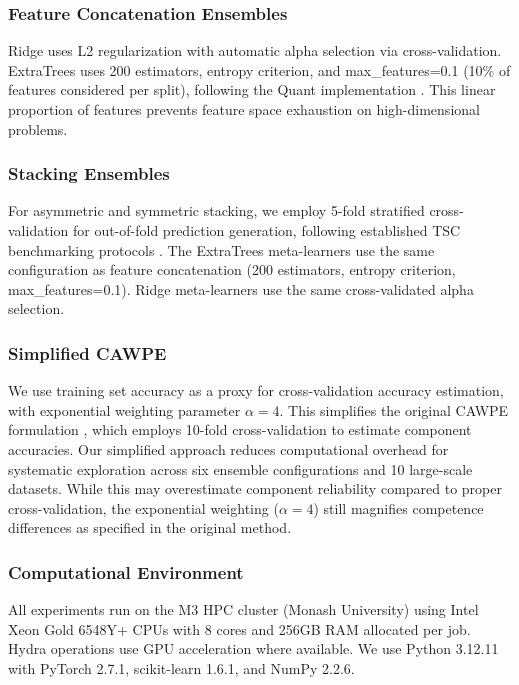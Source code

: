 \documentclass[pdflatex,sn-basic]{sn-jnl}           %
\theoremstyle{thmstyleone}%
\theoremstyle{thmstyletwo}%
\theoremstyle{thmstylethree}%
\begin{document}
\subsubsection{Feature Concatenation Ensembles} 

Ridge uses L2 regularization with automatic alpha selection via cross-validation. ExtraTrees uses 200 estimators, entropy criterion, and max\_features=0.1 (10\% of features considered per split), following the Quant implementation \citep{quant}. This linear proportion of features prevents feature space exhaustion on high-dimensional problems.

\subsubsection{Stacking Ensembles} 

For asymmetric and symmetric stacking, we employ 5-fold stratified cross-validation for out-of-fold prediction generation, following established TSC benchmarking protocols \citep{tsc-bakeoff}. The ExtraTrees meta-learners use the same configuration as feature concatenation (200 estimators, entropy criterion, max\_features=0.1). Ridge meta-learners use the same cross-validated alpha selection.

\subsubsection{Simplified CAWPE} 

We use training set accuracy as a proxy for cross-validation accuracy estimation, with exponential weighting parameter $\alpha=4$. This simplifies the original CAWPE formulation \citep{cawpe}, which employs 10-fold cross-validation to estimate component accuracies. Our simplified approach reduces computational overhead for systematic exploration across six ensemble configurations and 10 large-scale datasets. While this may overestimate component reliability compared to proper cross-validation, the exponential weighting ($\alpha=4$) still magnifies competence differences as specified in the original method.

\subsubsection{Computational Environment} 

All experiments run on the M3 HPC cluster (Monash University) using Intel Xeon Gold 6548Y+ CPUs with 8 cores and 256GB RAM allocated per job. Hydra operations use GPU acceleration where available. We use Python 3.12.11 with PyTorch 2.7.1, scikit-learn 1.6.1, and NumPy 2.2.6.
\end{document}
